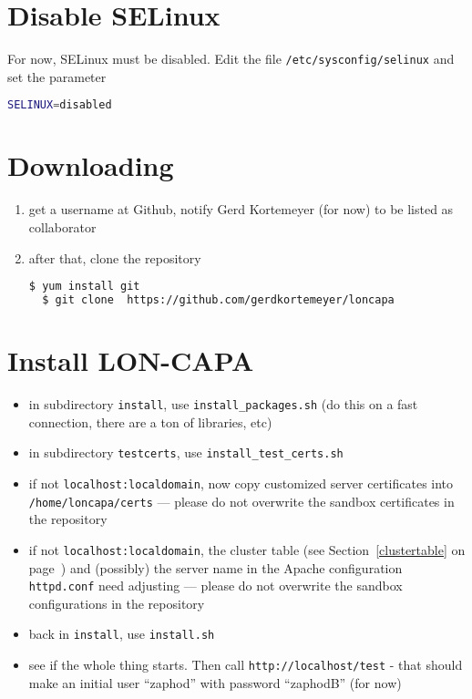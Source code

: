 \section{Disable SELinux}
For now, SELinux must be disabled.  Edit the file {\tt /etc/sysconfig/selinux} and set the parameter 
\begin{lstlisting}[language=bash]
  SELINUX=disabled
\end{lstlisting}

\section{Downloading}
\begin{enumerate}
\item get a username at Github, notify Gerd Kortemeyer (for now) to be listed as collaborator
\item after that, clone the repository
\begin{lstlisting}[language=bash]
  $ yum install git
  $ git clone  https://github.com/gerdkortemeyer/loncapa
\end{lstlisting}
\end{enumerate}

\section{Install LON-CAPA}
\begin{itemize}
\item in subdirectory {\tt install}, use {\tt install\_packages.sh} (do this on a fast connection, there are a ton of libraries, etc)
\item in subdirectory {\tt testcerts}, use {\tt install\_test\_certs.sh}
\item if not {\tt localhost:localdomain}, now copy customized server certificates into {\tt /home/loncapa/certs} --- please do not overwrite the sandbox certificates in the repository
\item if not {\tt localhost:localdomain}, the cluster table (see Section~\ref{clustertable} on page~\pageref{clustertable}) and (possibly) the server name in the Apache configuration {\tt httpd.conf} need adjusting --- please do not overwrite the sandbox configurations in the repository
\item back in {\tt install}, use {\tt install.sh}
\item see if the whole thing starts. Then call {\tt http://localhost/test} - that should make an initial user ``zaphod'' with password ``zaphodB'' (for now)
\end{itemize}

